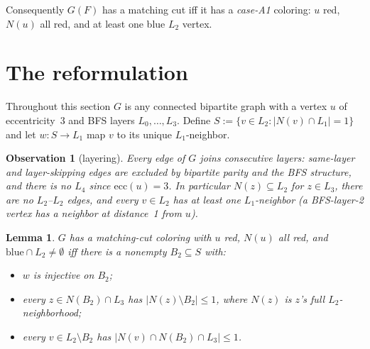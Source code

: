 \documentclass[11pt]{article}
\newtheorem{lemma}[theorem]{Lemma}
\newtheorem{observation}[theorem]{Observation}
\begin{document}
Consequently $G(F)$ has a matching cut iff it has a \emph{case-A1}
coloring: $u$ red, $N(u)$ all red, and at least one blue $L_2$
vertex.

\section{The reformulation}\label{sec:reform}

Throughout this section $G$ is any connected bipartite graph with a
vertex $u$ of eccentricity~3 and BFS layers $L_0,\dots,L_3$. Define
$S := \{v \in L_2 : |N(v) \cap L_1| = 1\}$ and let $w : S \to L_1$
map $v$ to its unique $L_1$-neighbor.

\begin{observation}[layering]\label{obs:layer}
Every edge of $G$ joins consecutive layers: same-layer and
layer-skipping edges are excluded by bipartite parity and the BFS
structure, and there is no $L_4$ since $\mathrm{ecc}(u)=3$. In
particular $N(z) \subseteq L_2$ for $z \in L_3$, there are no
$L_2$--$L_2$ edges, and every $v \in L_2$ has at least one
$L_1$-neighbor (a BFS-layer-2 vertex has a neighbor at distance~1
from $u$).
\end{observation}

\begin{lemma}\label{lem:reform}
$G$ has a matching-cut coloring with $u$ red, $N(u)$ all red, and
$\mathrm{blue} \cap L_2 \ne \emptyset$ \emph{iff} there is a nonempty
$B_2 \subseteq S$ with:
\begin{itemize}
\item[$(\alpha)$] $w$ is injective on $B_2$;
\item[$(\beta)$] every $z \in N(B_2) \cap L_3$ has
  $|N(z) \setminus B_2| \le 1$, where $N(z)$ is $z$'s full
  $L_2$-neighborhood;
\item[$(\gamma)$] every $v \in L_2 \setminus B_2$ has
  $|N(v) \cap N(B_2) \cap L_3| \le 1$.
\end{itemize}
\end{lemma}
\end{document}
